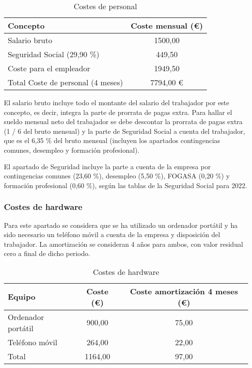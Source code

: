 \begin{table}[H]
\begin{center}
\begin{tabular}{| l | c |} \hline
\textbf{Concepto}   & \textbf{Coste mensual (€)}  \\ \hline
Salario bruto  & 1500,00 \\
Seguridad Social (29,90 \%)  & 449,50\\
Coste para el empleador  & 1949,50 \\ \hline
Total Coste de personal (4 meses)  & 7794,00 €\\ \hline
\end{tabular}
\caption{Costes de personal}
\end{center}
\end{table}


El salario bruto incluye todo el montante del salario del trabajador por este concepto, es decir, integra la parte de prorrata de pagas extra. Para hallar el sueldo mensual neto del trabajador se debe descontar la prorrata de pagas extra (1 / 6 del bruto mensual) y la parte de Seguridad Social a cuenta del trabajador, que es el 6,35 \% del bruto mensual (incluyen los apartados contingencias comunes, desempleo y formación profesional).

El apartado de Seguridad incluye la parte a cuenta de la empresa por contingencias comunes
(23,60 \%), desempleo (5,50 \%), FOGASA (0,20 \%) y formación profesional (0,60 \%), según las tablas de la Seguridad Social para 2022.

\subsubsection{Costes de hardware}
Para este apartado se considera que se ha utilizado un ordenador portátil y ha sido necesario un teléfono móvil a cuenta de la empresa y disposición del trabajador. La amortización se consideran 4 años para ambos, con valor residual cero a final de dicho periodo.


\begin{table}[H]
\begin{center}
\begin{tabular}{| l | c | c |} \hline
\textbf{Equipo}   & \textbf{Coste (€)} & \textbf{Coste amortización 4 meses (€)}  \\ \hline
Ordenador portátil & 900,00 & 75,00 \\
Teléfono móvil & 264,00 & 22,00\\  \hline 
Total & 1164,00 & 97,00\\ \hline

\end{tabular}
\caption{Costes de hardware}
\end{center}
\end{table}



